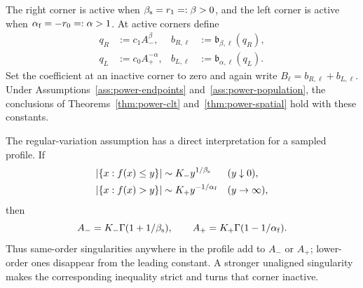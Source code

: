 \documentclass[11pt]{article}
\theoremstyle{remark}
\theoremstyle{plain}
\begin{document}
The right corner is active when $\beta_{\rm s}=r_1=:\beta>0$, and the left
corner is active when $\alpha_{\rm f}=-r_0=:\alpha>1$.  At active corners
define
\begin{align}
 q_R&:=c_1A_-^\beta,
 &b_{R,\ell}&:=\mathfrak b_{\beta,\ell}(q_R),
 \label{eq:general-q-right}\\
 q_L&:=c_0A_+^{-\alpha},
 &b_{L,\ell}&:=\mathfrak b_{\alpha,\ell}(q_L).
 \label{eq:general-q-left}
\end{align}
Set the coefficient at an inactive corner to zero and again write
$B_\ell=b_{R,\ell}+b_{L,\ell}$.  Under
Assumptions~\ref{ass:power-endpoints} and~\ref{ass:power-population},
the conclusions of Theorems~\ref{thm:power-clt}
and~\ref{thm:power-spatial} hold with these constants.

The regular-variation assumption has a direct interpretation for a sampled
profile.  If
\begin{align*}
 |\{x:f(x)\le y\}|&\sim K_-y^{1/\beta_{\rm s}}
 &&(y\downarrow0),\\
 |\{x:f(x)>y\}|&\sim K_+y^{-1/\alpha_{\rm f}}
 &&(y\to\infty),
\end{align*}
then
\[
 A_-=K_-\Gamma(1+1/\beta_{\rm s}),\qquad
 A_+=K_+\Gamma(1-1/\alpha_{\rm f}).
\]
Thus same-order singularities anywhere in the profile add to $A_-$ or
$A_+$; lower-order ones disappear from the leading constant.  A stronger
unaligned singularity makes the corresponding inequality strict and turns
that corner inactive.
\end{document}
